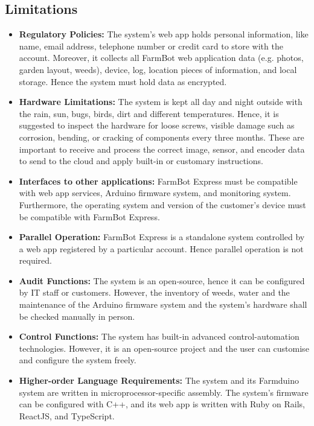 \subsection{Limitations}

\begin{itemize}
    \item \textbf{Regulatory Policies:} The system's web app holds personal information, like name, email address, telephone number or credit card to store with the account. Moreover, it collects all FarmBot web application data (e.g. photos, garden layout, weeds), device, log, location pieces of information, and local storage. Hence the system must hold data as encrypted.

    \item \textbf{Hardware Limitations:} The system is kept all day and night outside with the rain, sun, bugs, birds, dirt and different temperatures. Hence, it is suggested to inspect the hardware for loose screws, visible damage such as corrosion, bending, or cracking of components every three months. These are important to receive and process the correct image, sensor, and encoder data to send to the cloud and apply built-in or customary instructions.

    \item \textbf{Interfaces to other applications:} FarmBot Express must be compatible with web app services, Arduino firmware system, and monitoring system. Furthermore, the operating system and version of the customer's device must be compatible with FarmBot Express.

    \item \textbf{Parallel Operation:} FarmBot Express is a standalone system controlled by a web app registered by a particular account. Hence parallel operation is not required.

    \item \textbf{Audit Functions:} The system is an open-source, hence it can be configured by IT staff or customers. However, the inventory of weeds, water and the maintenance of the Arduino firmware system and the system's hardware shall be checked manually in person.

    \item \textbf{Control Functions:} The system has built-in advanced control-automation technologies. However, it is an open-source project and the user can customise and configure the system freely.

    \item \textbf{Higher-order Language Requirements:} The system and its Farmduino system are written in microprocessor-specific assembly. The system's firmware can be configured with C++, and its web app is written with Ruby on Rails, ReactJS, and TypeScript.


\end{itemize}
